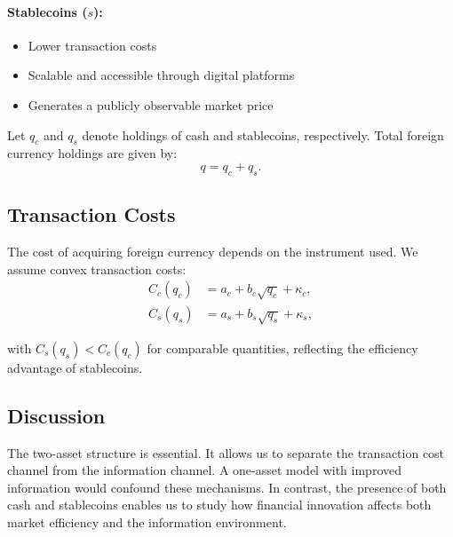 \paragraph{Stablecoins ($s$):}
\begin{itemize}
\item Lower transaction costs
\item Scalable and accessible through digital platforms
\item Generates a publicly observable market price
\end{itemize}

Let $q_c$ and $q_s$ denote holdings of cash and stablecoins, respectively. Total foreign currency holdings are given by:
\begin{equation}
q = q_c + q_s.
\end{equation}

\subsection{Transaction Costs}

The cost of acquiring foreign currency depends on the instrument used. We assume convex transaction costs:
\begin{align}
C_c(q_c) &= a_c + b_c \sqrt{q_c} + \kappa_c, \\
C_s(q_s) &= a_s + b_s \sqrt{q_s} + \kappa_s,
\end{align}

with $C_s(q_s) < C_c(q_c)$ for comparable quantities, reflecting the efficiency advantage of stablecoins.

\subsection{Discussion}

The two-asset structure is essential. It allows us to separate the transaction cost channel from the information channel. A one-asset model with improved information would confound these mechanisms. In contrast, the presence of both cash and stablecoins enables us to study how financial innovation affects both market efficiency and the information environment.
